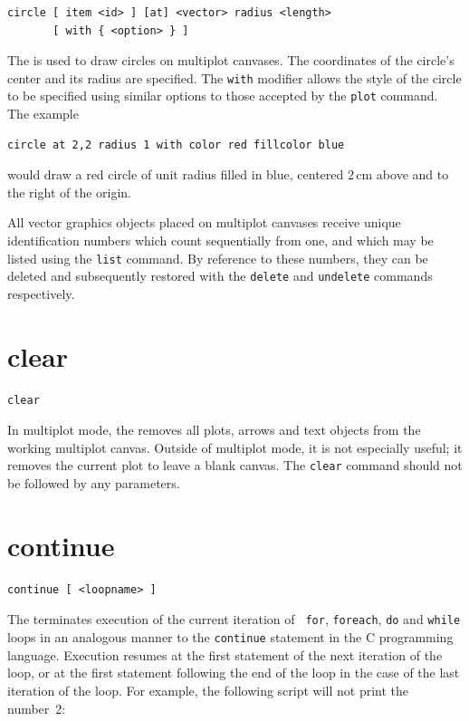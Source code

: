 \begin{verbatim}
circle [ item <id> ] [at] <vector> radius <length>
       [ with { <option> } ]
\end{verbatim}

The  is used to draw circles on multiplot canvases.  The
coordinates of the circle's center and its radius are specified. The {\tt with}
modifier allows the style of the circle to be specified using similar options
to those accepted by the {\tt plot} command.  The example

\begin{verbatim}
circle at 2,2 radius 1 with color red fillcolor blue
\end{verbatim}

\noindent would draw a red circle of unit radius filled in blue, centered
$2\,\mathrm{cm}$ above and to the right of the origin.

All vector graphics objects placed on multiplot canvases receive unique
identification numbers which count sequentially from one, and which may be
listed using the {\tt list} command.  By reference to these numbers, they can
be deleted and subsequently restored with the {\tt delete} and {\tt undelete}
commands respectively.


\section{clear}

\begin{verbatim}
clear
\end{verbatim}

In multiplot mode, the  removes all plots, arrows and text
objects from the working multiplot canvas. Outside of multiplot mode, it is not
especially useful; it removes the current plot to leave a blank canvas.  The
{\tt clear} command should not be followed by any parameters.


\section{continue}

\begin{verbatim}
continue [ <loopname> ]
\end{verbatim}

The  terminates execution of the current iteration of {\tt
for}, {\tt foreach}, {\tt do} and {\tt while} loops in an analogous manner to
the {\tt continue} statement in the C programming language. Execution resumes
at the first statement of the next iteration of the loop, or at the first
statement following the end of the loop in the case of the last iteration of
the loop.  For example, the following script will not print the number~2:

